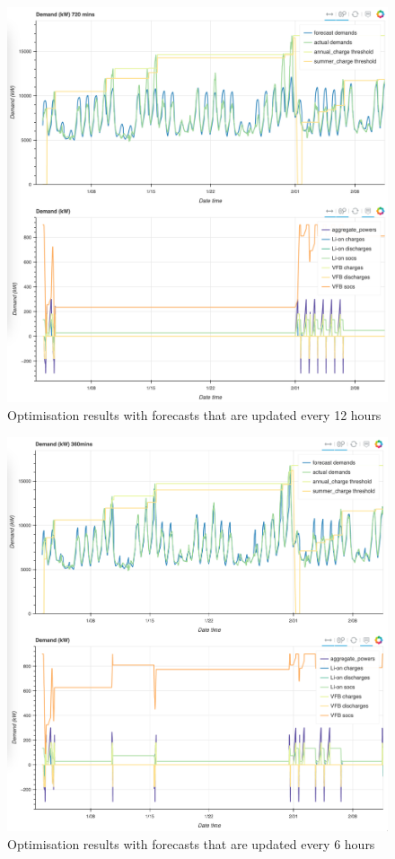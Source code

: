 \begin{figure}[p]
	\centering
	\includegraphics[width=1\linewidth]{pics/720min-forecasts}
	\caption{Optimisation results with forecasts that are updated every 12 hours}
	\label{fig:720min-forecasts}
\end{figure}

\begin{figure}[p]
	\centering
	\includegraphics[width=1\linewidth]{pics/360min-forecasts}
	\caption{Optimisation results with forecasts that are updated every 6 hours}
	\label{fig:360min-forecasts}
\end{figure}

